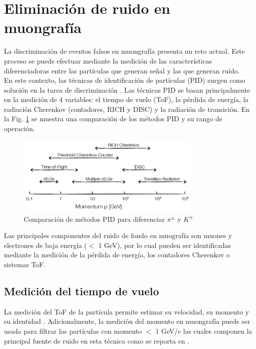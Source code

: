 
\section{Eliminación de ruido en muongrafía}

La discriminación de eventos falsos en muongrafía presenta un reto actual. Este proceso se puede efectuar mediante la medición de las características diferenciadoras entre las partículas que generan señal y las que generan ruido.\\

En este contexto, las técnicas de identificación de partículas (PID) surgen como solución en la tarea de discriminación \cite{Nishiyama2016}. Las técnicas PID se basan principalmente en la medición de 4 variables: el tiempo de vuelo (ToF), la pérdida de energía, la radiación Cherenkov (contadores, RICH y DISC) y la radiación de transición. En la Fig. \ref{PID} se muestra una comparación de los métodos PID y su rango de operación.

\begin{figure}[h!]
\begin{center}
\includegraphics[width=0.8\textwidth]{Figures/PID}
\caption[]{Comparación de métodos PID para diferenciar $\pi^{\pm}$ y $K^{\pm}$ \cite{Kleinknecht2005}}
\label{PID}
\end{center}
\end{figure}

Las principales componentes del ruido de fondo en muografía son muones y electrones de baja energía ($<$ 1 GeV), por lo cual pueden ser identificadas mediante la medición de la pérdida de energía, los contadores Cherenkov o sistemas ToF.

\subsection{Medición del tiempo de vuelo}

La medición del ToF de la partícula permite estimar su velocidad, su momento \cite{Best2015} y su identidad \cite{Gruttola2014, Kolanoski2016}. Adicionalmente, la medición del momento en muongrafía puede ser usada para filtrar las partículas con momento $<$ 1 GeV/c las cuales componen la principal fuente de ruido en esta técnica como se reporta en \cite{Nishiyama2014,Gomez2017}.

